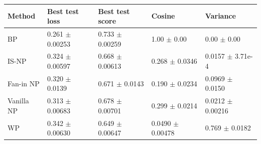 \begin{tabular}{lllll}
\toprule
Method & Best test loss & Best test score & Cosine & Variance \\
\midrule
BP & 0.261 $\pm$ 0.00253 & 0.733 $\pm$ 0.00259 & 1.00 $\pm$ 0.00 & 0.00 $\pm$ 0.00 \\
IS-NP & 0.324 $\pm$ 0.00597 & 0.668 $\pm$ 0.00613 & 0.268 $\pm$ 0.0346 & 0.0157 $\pm$ 3.71e-4 \\
Fan-in NP & 0.320 $\pm$ 0.0139 & 0.671 $\pm$ 0.0143 & 0.190 $\pm$ 0.0234 & 0.0969 $\pm$ 0.0150 \\
Vanilla NP & 0.313 $\pm$ 0.00683 & 0.678 $\pm$ 0.00701 & 0.299 $\pm$ 0.0214 & 0.0212 $\pm$ 0.00216 \\
WP & 0.342 $\pm$ 0.00630 & 0.649 $\pm$ 0.00647 & 0.0490 $\pm$ 0.00478 & 0.769 $\pm$ 0.0182 \\
\bottomrule
\end{tabular}

